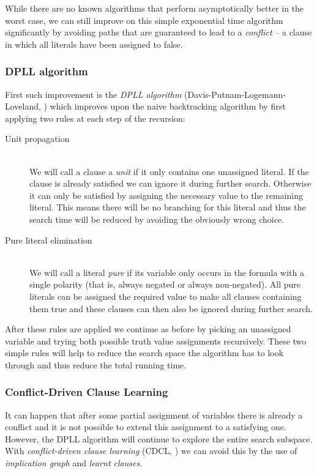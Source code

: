 While there are no known algorithms that perform asymptotically better in the worst case, we can still improve on this simple exponential time algorithm significantly by avoiding paths that are guaranteed to lead to a \emph{conflict} -- a clause in which all literals have been assigned to false.

\subsubsection{DPLL algorithm}
First such improvement is the \emph{DPLL algorithm} (Davis-Putnam-Logemann-Loveland, \cite{davis1960computing,davis1962machine}) which improves upon the naive backtracking algorithm by first applying two rules at each step of the recursion:

\begin{description}
\item[Unit propagation] \hfill \\
We will call a clause a \emph{unit} if it only contains one unassigned literal.
If the clause is already satisfied we can ignore it during further search.
Otherwise it can only be satisfied by assigning the necessary value to the remaining literal.
This means there will be no branching for this literal and thus the search time will be reduced by avoiding the obviously wrong choice.

\item[Pure literal elimination] \hfill \\
We will call a literal \emph{pure} if its variable only occurs in the formula with a single polarity (that is, always negated or always non-negated).
All pure literals can be assigned the required value to make all clauses containing them true and these clauses can then also be ignored during further search.
\end{description}

After these rules are applied we continue as before by picking an unassigned variable and trying both possible truth value assignments recursively.
These two simple rules will help to reduce the search space the algorithm has to look through and thus reduce the total running time.

\subsubsection{Conflict-Driven Clause Learning}
It can happen that after some partial assignment of variables there is already a conflict and it is not possible to extend this assignment to a satisfying one.
However, the DPLL algorithm will continue to explore the entire search subspace.
With \emph{conflict-driven clause learning} (CDCL, \citep{bayardo1997using,silva1997grasp}) we can avoid this by the use of \emph{implication graph} and \emph{learnt clauses}.

